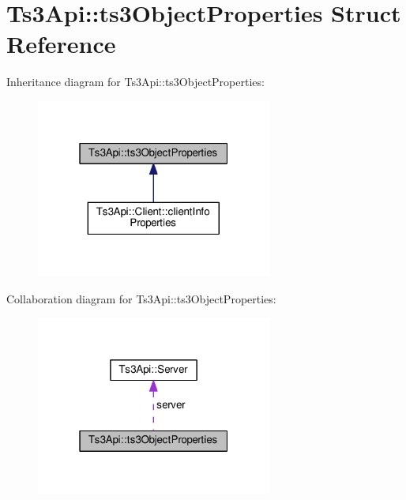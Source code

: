 \hypertarget{struct_ts3_api_1_1ts3_object_properties}{}\section{Ts3\+Api\+:\+:ts3\+Object\+Properties Struct Reference}
\label{struct_ts3_api_1_1ts3_object_properties}


Inheritance diagram for Ts3\+Api\+:\+:ts3\+Object\+Properties\+:\nopagebreak
\begin{figure}[H]
\begin{center}
\leavevmode
\includegraphics[width=220pt]{struct_ts3_api_1_1ts3_object_properties__inherit__graph}
\end{center}
\end{figure}


Collaboration diagram for Ts3\+Api\+:\+:ts3\+Object\+Properties\+:\nopagebreak
\begin{figure}[H]
\begin{center}
\leavevmode
\includegraphics[width=220pt]{struct_ts3_api_1_1ts3_object_properties__coll__graph}
\end{center}
\end{figure}
